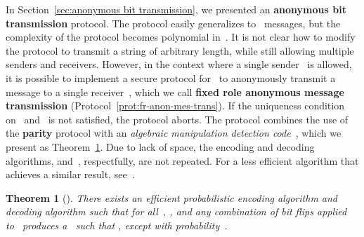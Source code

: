 \documentclass[11pt]{article}
\newtheorem{theorem}{Theorem}[section]
\begin{document}
In Section~\ref{sec:anonymous bit transmission}, we presented an
\textbf{anonymous bit transmission} protocol. The protocol easily
generalizes to~ messages, but the complexity of the protocol
becomes polynomial in~. It is not clear how to modify the
protocol to transmit a string of arbitrary length, while still
allowing multiple senders and receivers. However, in the context
where a single sender~ is allowed, it is possible to implement a
secure protocol for~ to anonymously transmit a message to a
single receiver~, which we call \textbf{fixed role anonymous
message transmission} (Protocol~\ref{prot:fr-anon-mes-trans}). If
the uniqueness condition on~ and~ is not satisfied, the
protocol aborts.  The protocol combines the use of the
\textbf{parity} protocol with an \emph{algebraic manipulation
detection code}~\cite{CFP07}, which we present as
Theorem~\ref{thm:serge}. Due to lack of space, the encoding and
decoding algorithms,   and~, respectfully, are not repeated.
For a less efficient algorithm that achieves a similar result,
see~\cite{PSV99}.




\begin{theorem}[\cite{CFP07}] \label{thm:serge}
There exists an efficient probabilistic encoding algorithm
 and decoding
algorithm  such that for all~, , and
any combination of bit
flips applied to~ produces a~ such that
, except with probability~.
\end{theorem}
\end{document}
